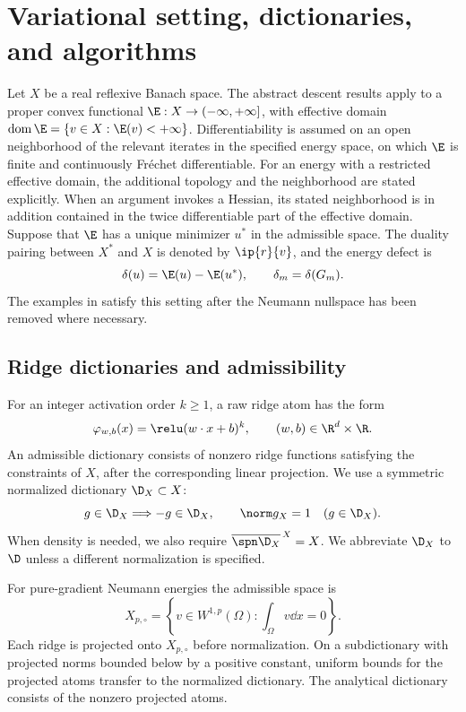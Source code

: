 \section{Variational setting, dictionaries, and algorithms}
\label{sec:setting}

Let \(X\) be a real reflexive Banach space. The abstract descent results apply to a proper convex
functional \(\E:X\to(-\infty,+\infty]\), with effective domain
\(\operatorname{dom}\E=\{v\in X:\E(v)<+\infty\}\).
Differentiability is assumed on an open neighborhood of the relevant iterates in the specified
energy space, on which \(\E\) is finite and continuously Fr\'echet differentiable. For an energy
with a restricted effective domain, the additional topology and the neighborhood are stated
explicitly. When an argument invokes a Hessian, its stated neighborhood is in addition contained in
the twice differentiable part of the effective domain. Suppose that \(\E\) has a unique minimizer
\(u^*\) in the admissible space. The duality pairing between \(X^*\) and \(X\) is denoted by
\(\ip{r}{v}\), and the energy defect is
\[
  \delta(u)=\E(u)-\E(u^*), \qquad \delta_m=\delta(G_m).
\]
The examples in  satisfy this setting after the Neumann nullspace has been
removed where necessary.

\subsection{Ridge dictionaries and admissibility}

For an integer activation order \(k\geq1\), a raw ridge atom has the form
\[
  \varphi_{w,b}(x)=\relu(w\cdot x+b)^k,
  \qquad (w,b)\in\R^d\times\R.
\]
An admissible dictionary consists of nonzero ridge functions satisfying the constraints of \(X\),
after the corresponding linear projection. We use a symmetric normalized dictionary
\(\D_X\subset X\):
\[
g\in\D_X\Longrightarrow-g\in\D_X,\qquad \norm g_X=1\quad(g\in\D_X).
\]
When density is needed, we also require \(\overline{\spn\D_X}^{\,X}=X\).
We abbreviate \(\D_X\) to \(\D\) unless a different normalization is specified.

For pure-gradient Neumann energies the admissible space is
\[
  X_{p,\circ}=\left\{v\in W^{1,p}(\Omega):\int_\Omega v\dd x=0\right\}.
\]
Each ridge is projected onto \(X_{p,\circ}\) before normalization. On a subdictionary with projected norms bounded below by a positive constant, uniform bounds for the projected atoms transfer to the normalized dictionary. The analytical dictionary consists of the nonzero projected atoms.

